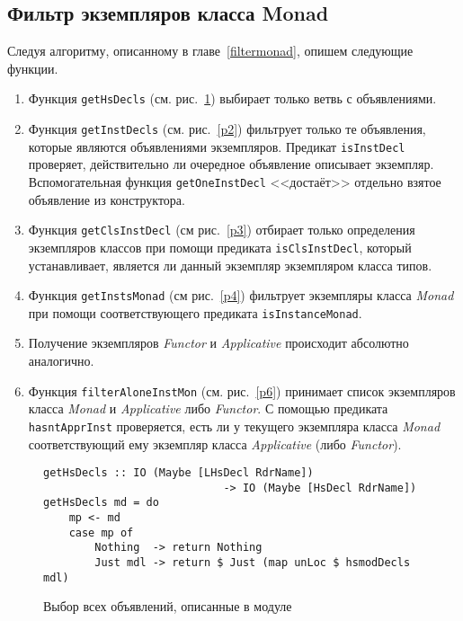 \subsection{Фильтр экземпляров класса Monad}
Следуя алгоритму, описанному в главе~\ref{filtermonad}, опишем следующие функции.
\begin{enumerate}
\item Функция \lstinline{getHsDecls} (см. рис.~\ref{p1}) выбирает только ветвь с объявлениями.
\item Функция \lstinline{getInstDecls} (см. рис.~\ref{p2}) фильтрует только те объявления, которые являются объявлениями экземпляров. Предикат \lstinline{isInstDecl} проверяет, действительно ли очередное объявление описывает экземпляр. Вспомогательная функция \lstinline{getOneInstDecl} <<достаёт>> отдельно взятое объявление из конструктора.
\item Функция \lstinline{getClsInstDecl} (см рис.~\ref{p3}) отбирает только определения экземпляров классов при помощи предиката \lstinline{isClsInstDecl}, который устанавливает, является ли данный экземпляр экземпляром класса типов.
\item Функция \lstinline{getInstsMonad} (см рис.~\ref{p4}) фильтрует экземпляры класса \textit{Monad} при помощи соответствующего предиката \lstinline{isInstanceMonad}.
\item Получение экземпляров \textit{Functor} и \textit{Applicative} происходит абсолютно аналогично.
\item Функция \lstinline{filterAloneInstMon} (см. рис.~\ref{p6}) принимает список экземпляров класса \textit{Monad} и \textit{Applicative} либо \textit{Functor}. С помощью предиката \lstinline{hasntApprInst} проверяется, есть ли у текущего экземпляра класса \textit{Monad} соответствующий ему экземпляр класса \textit{Applicative} (либо \textit{Functor}).
\end{enumerate}

\begin{figure}[h]
\hrulefill
\begin{lstlisting}
getHsDecls :: IO (Maybe [LHsDecl RdrName]) 
                            -> IO (Maybe [HsDecl RdrName])
getHsDecls md = do
    mp <- md
    case mp of
        Nothing  -> return Nothing
        Just mdl -> return $ Just (map unLoc $ hsmodDecls mdl)
\end{lstlisting}
\hrulefill
\caption{Выбор всех объявлений, описанные в модуле}\label{p1}
\end{figure}

